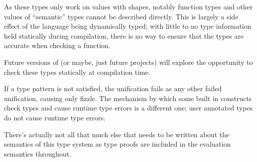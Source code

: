 As these types only work on values with shapes, notably function types and
other values of ``semantic'' types cannot be described directly. This is largely
a side effect of the language being dynamically typed; with little to no type
information held statically during compilation, there is no way to ensure that
the types are accurate when checking a function.

Future versions of \Trilogy{} (or maybe, just future projects) will explore the
opportunity to check these types statically at compilation time.

\begin{prooftree}
\end{prooftree}

\begin{prooftree}
\end{prooftree}

If a type pattern is not satisfied, the unification fails as any other
failed unification, causing only fizzle. The mechanism by which some
built in constructs check types and cause runtime type errors is a different
one; user annotated types do not cause runtime type errors.

There's actually not all that much else that needs to be written about the
semantics of this type system as type proofs are included in the
evaluation semantics throughout.
